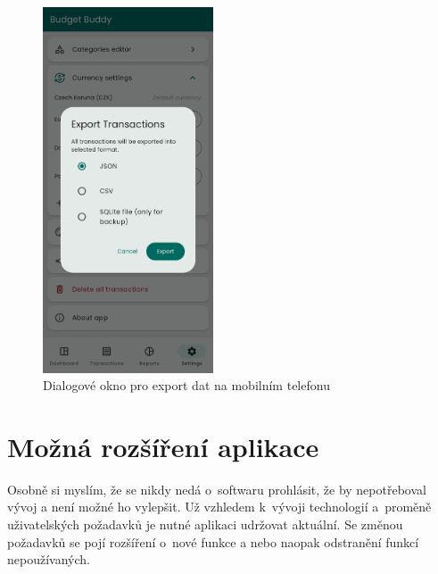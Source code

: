 \documentclass[
  biblatex,
  figures=true,
  tables=false,
  glossaries,
  index
]{kidiplom}
\begin{document}
\begin{figure}
  \centering
  \includegraphics[width=0.45\textwidth]{images/export-mobile.png}
  \caption{Dialogové okno pro export dat na mobilním telefonu}
  \label{fig:export}
\end{figure}

\section{Možná rozšíření aplikace}
Osobně si myslím, že se nikdy nedá o~softwaru prohlásit, že by nepotřeboval vývoj a není možné ho vylepšit. Už vzhledem k~vývoji technologií a~proměně uživatelských požadavků je nutné aplikaci udržovat aktuální. Se změnou požadavků se pojí rozšíření o~nové funkce a nebo naopak odstranění funkcí nepoužívaných.
\end{document}
